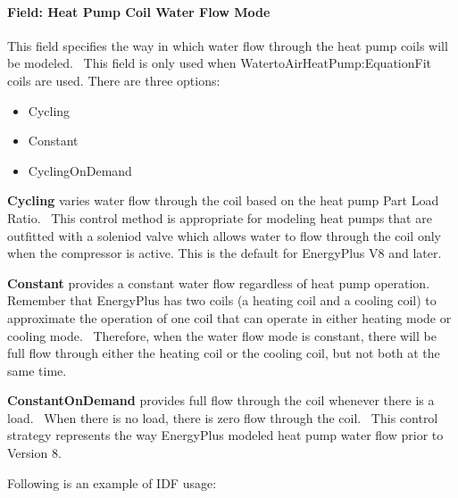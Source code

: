 \paragraph{Field: Heat Pump Coil Water Flow Mode}\label{field-heat-pump-coil-water-flow-mode-000}

This field specifies the way in which water flow through the heat pump coils will be modeled.~ This field is only used when WatertoAirHeatPump:EquationFit coils are used. There are three options:

\begin{itemize}
\item
  Cycling
\item
  Constant
\item
  CyclingOnDemand
\end{itemize}

\textbf{Cycling} varies water flow through the coil based on the heat pump Part Load Ratio.~ This control method is appropriate for modeling heat pumps that are outfitted with a soleniod valve which allows water to flow through the coil only when the compressor is active. This is the default for EnergyPlus V8 and later.

\textbf{Constant} provides a constant water flow regardless of heat pump operation.~ Remember that EnergyPlus has two coils (a heating coil and a cooling coil) to approximate the operation of one coil that can operate in either heating mode or cooling mode.~ Therefore, when the water flow mode is constant, there will be full flow through either the heating coil or the cooling coil, but not both at the same time.

\textbf{ConstantOnDemand} provides full flow through the coil whenever there is a load.~ When there is no load, there is zero flow through the coil.~ This control strategy represents the way EnergyPlus modeled heat pump water flow prior to Version 8.

Following is an example of IDF usage:

